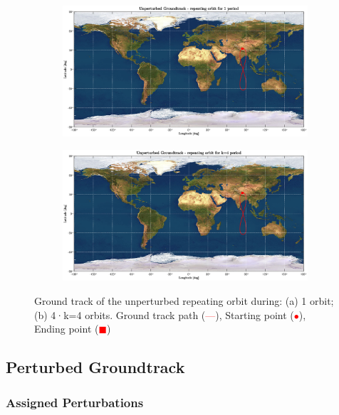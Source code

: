 \documentclass{article}
\newcommand{\reddashedline}{\textcolor{red}{---}}
\begin{document}
\begin{figure}[H]
	\centering
	\begin{subfigure}[b]{0.45\textwidth}
		\includegraphics[width=\textwidth]{ugro1orb.eps}
		\caption{}
		\label{fig:3a}
	\end{subfigure}
	\hfill
	\begin{subfigure}[b]{0.45\textwidth}
		\includegraphics[width=\textwidth]{ugro4orb.eps}
		\caption{}
		\label{fig:3b}
	\end{subfigure}
	
	\caption{Ground track of the unperturbed repeating orbit during: (a) 1 orbit; (b) 4·k=4 orbits. Ground track path (\reddashedline), Starting point (\textcolor{red}{$\bullet$}), Ending point (\textcolor{red}{$\blacksquare$})
	}
\end{figure}

\subsection{Perturbed Groundtrack}
\subsubsection{Assigned Perturbations}
\end{document}
